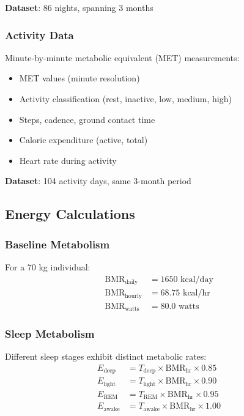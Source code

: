 \documentclass[12pt,twocolumn]{article}
\theoremstyle{remark}
\begin{document}
\textbf{Dataset}: 86 nights, spanning 3 months

\subsubsection{Activity Data}

Minute-by-minute metabolic equivalent (MET) measurements:
\begin{itemize}
\item MET values (minute resolution)
\item Activity classification (rest, inactive, low, medium, high)
\item Steps, cadence, ground contact time
\item Caloric expenditure (active, total)
\item Heart rate during activity
\end{itemize}

\textbf{Dataset}: 104 activity days, same 3-month period

\subsection{Energy Calculations}

\subsubsection{Baseline Metabolism}

For a 70 kg individual:
\begin{align}
\text{BMR}_{\text{daily}} &= 1650 \text{ kcal/day} \\
\text{BMR}_{\text{hourly}} &= 68.75 \text{ kcal/hr} \\
\text{BMR}_{\text{watts}} &= 80.0 \text{ watts}
\end{align}

\subsubsection{Sleep Metabolism}

Different sleep stages exhibit distinct metabolic rates:
\begin{align}
E_{\text{deep}} &= T_{\text{deep}} \times \text{BMR}_{\text{hr}} \times 0.85 \\
E_{\text{light}} &= T_{\text{light}} \times \text{BMR}_{\text{hr}} \times 0.90 \\
E_{\text{REM}} &= T_{\text{REM}} \times \text{BMR}_{\text{hr}} \times 0.95 \\
E_{\text{awake}} &= T_{\text{awake}} \times \text{BMR}_{\text{hr}} \times 1.00
\end{align}
\end{document}
